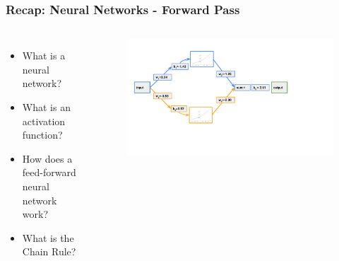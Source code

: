 \documentclass[aspectratio=169]{beamer}
\newcommand{\myblue}[1]{{\color{blue}{#1}}}
\begin{document}
\begin{frame}[fragile]\frametitle{Recap: Neural Networks - Forward Pass}
\myblue{What did we talk about last?}
\begin{columns}
        \begin{itemize}
            \item What is a neural network?
            \item What is an activation function?
            \item How does a feed-forward neural network work?
            \item What is the Chain Rule?
        \end{itemize}
        \begin{figure}
        \centering
        \includegraphics[trim={1cm 3cm 5cm 0.35cm },clip,width=\linewidth]{BP_5}
        \end{figure}
\end{columns}
\end{frame}
\end{document}
